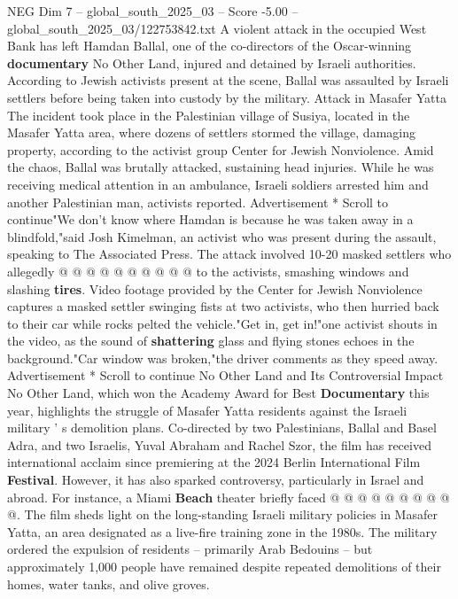 \begin{textsample}{NEG Dim 7 – global\_south\_2025\_03 – Score -5.00 – global\_south\_2025\_03/122753842.txt}  \label{ex:f7_neg_354}
A violent attack in the occupied West Bank has left Hamdan Ballal, one of the co-directors of the Oscar-winning \textbf{documentary} No Other Land, injured and detained by Israeli authorities.
According to Jewish activists present at the scene, Ballal was assaulted by Israeli settlers before being taken into custody by the military.
Attack in Masafer Yatta The incident took place in the Palestinian village of Susiya, located in the Masafer Yatta area, where dozens of settlers stormed the village, damaging property, according to the activist group Center for Jewish Nonviolence.
Amid the chaos, Ballal was brutally attacked, sustaining head injuries.
While he was receiving medical attention in an ambulance, Israeli soldiers arrested him and another Palestinian man, activists reported.
Advertisement * Scroll to continue"We don't know where Hamdan is because he was taken away in a blindfold,"said Josh Kimelman, an activist who was present during the assault, speaking to The Associated Press.
The attack involved 10-20 masked settlers who allegedly @ @ @ @ @ @ @ @ @ @ to the activists, smashing windows and slashing \textbf{tires}.
Video footage provided by the Center for Jewish Nonviolence captures a masked settler swinging fists at two activists, who then hurried back to their car while rocks pelted the vehicle."Get in, get in!"one activist shouts in the video, as the sound of \textbf{shattering} glass and flying stones echoes in the background."Car window was broken,"the driver comments as they speed away.
Advertisement * Scroll to continue No Other Land and Its Controversial Impact No Other Land, which won the Academy Award for Best \textbf{Documentary} this year, highlights the struggle of Masafer Yatta residents against the Israeli military ' s demolition plans.
Co-directed by two Palestinians, Ballal and Basel Adra, and two Israelis, Yuval Abraham and Rachel Szor, the film has received international acclaim since premiering at the 2024 Berlin International Film \textbf{Festival}.
However, it has also sparked controversy, particularly in Israel and abroad.
For instance, a Miami \textbf{Beach} theater briefly faced @ @ @ @ @ @ @ @ @ @.
The film sheds light on the long-standing Israeli military policies in Masafer Yatta, an area designated as a live-fire training zone in the 1980s.
The military ordered the expulsion of residents -- primarily Arab Bedouins -- but approximately 1,000 people have remained despite repeated demolitions of their homes, water tanks, and olive groves.

\end{textsample}
